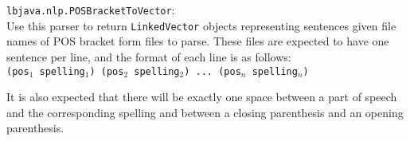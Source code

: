 \begin{list}{}{}
\item[{\tt lbjava.nlp.POSBracketToVector}:] ~\\
Use this parser to return {\tt LinkedVector} objects representing sentences
given file names of POS bracket form files to parse.  These files are expected
to have one sentence per line, and the format of each line is as follows: \\

\vspace{-.25cm}
{\tt (pos$_1$ spelling$_1$) (pos$_2$ spelling$_2$) ... (pos$_n$ spelling$_n$)}
\\
\vspace{-.25cm}

\noindent
It is also expected that there will be exactly one space between a part of
speech and the corresponding spelling and between a closing parenthesis and an
opening parenthesis.

\end{list}

